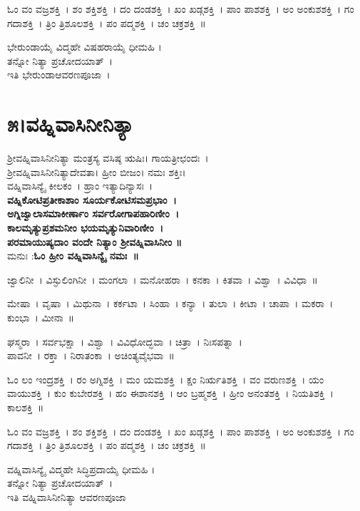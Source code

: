 ಓಂ ವಂ ವಜ್ರಶಕ್ತಿ~।  ಶಂ ಶಕ್ತಿಶಕ್ತಿ~।  ದಂ ದಂಡಶಕ್ತಿ~।  ಖಂ ಖಡ್ಗಶಕ್ತಿ~।  ಪಾಂ ಪಾಶಶಕ್ತಿ~।  ಅಂ ಅಂಕುಶಶಕ್ತಿ~।  ಗಂ ಗದಾಶಕ್ತಿ~।  ತ್ರಿಂ ತ್ರಿಶೂಲಶಕ್ತಿ~।  ಪಂ ಪದ್ಮಶಕ್ತಿ~।  ಚಂ ಚಕ್ರಶಕ್ತಿ~॥ 

ಭೇರುಂಡಾಯೈ ವಿದ್ಮಹೇ ವಿಷಹರಾಯೈ ಧೀಮಹಿ ।\\ತನ್ನೋ ನಿತ್ಯಾ ಪ್ರಚೋದಯಾತ್~।\\
ಇತಿ ಭೇರುಂಡಾಆವರಣಪೂಜಾ~।
\section{೫।ವಹ್ನಿವಾಸಿನೀನಿತ್ಯಾ}
ಶ್ರೀವಹ್ನಿವಾಸಿನೀನಿತ್ಯಾ ಮಂತ್ರಸ್ಯ ವಸಿಷ್ಠ ಋಷಿಃ। ಗಾಯತ್ರೀಛಂದಃ~।\\ ಶ್ರೀವಹ್ನಿವಾಸಿನೀನಿತ್ಯಾದೇವತಾ। ಹ್ರೀಂ ಬೀಜಂ। ನಮಃ ಶಕ್ತಿಃ।\\ ವಹ್ನಿವಾಸಿನ್ಯೈ ಕೀಲಕಂ~। ಹ್ರಾಂ ಇತ್ಯಾದಿನ್ಯಾಸಃ~।\\
{\bfseries ವಹ್ನಿಕೋಟಿಪ್ರತೀಕಾಶಾಂ ಸೂರ್ಯಕೋಟಿಸಮಪ್ರಭಾಂ~।\\
ಅಗ್ನಿಜ್ವಾಲಾಸಮಾಕೀರ್ಣಾಂ ಸರ್ವರೋಗಾಪಹಾರಿಣೀಂ~।\\
ಕಾಲಮೃತ್ಯುಪ್ರಶಮನೀಂ ಭಯಮೃತ್ಯುನಿವಾರಿಣೀಂ~।\\
ಪರಮಾಯುಷ್ಯದಾಂ ವಂದೇ ನಿತ್ಯಾಂ ಶ್ರೀವಹ್ನಿವಾಸಿನೀಂ ॥\\}
ಮನುಃ :{\bfseries ಓಂ ಹ್ರೀಂ ವಹ್ನಿವಾಸಿನ್ಯೈ ನಮಃ~॥}

ಜ್ವಾಲಿನೀ~। ವಿಸ್ಫುಲಿಂಗಿನೀ~। ಮಂಗಲಾ~। ಮನೋಹರಾ~। ಕನಕಾ~। ಕಿತವಾ~। ವಿಶ್ವಾ~। ವಿವಿಧಾ~॥

ಮೇಷಾ~। ವೃಷಾ~। ಮಿಥುನಾ~। ಕರ್ಕಟಾ~। ಸಿಂಹಾ~। ಕನ್ಯಾ~। ತುಲಾ~। ಕೀಟಾ~। ಚಾಪಾ~। ಮಕರಾ~। ಕುಂಭಾ~। ಮೀನಾ~॥ 

ಘಸ್ಮರಾ~। ಸರ್ವಭಕ್ಷಾ~। ವಿಶ್ವಾ~। ವಿವಿಧೋದ್ಭವಾ~। ಚಿತ್ರಾ~। ನಿಃಸಪತ್ನಾ~।\\ ಪಾವನೀ~। ರಕ್ತಾ~। ನಿರಾತಂಕಾ~। ಅಚಿಂತ್ಯವೈಭವಾ~॥

ಓಂ ಲಂ ಇಂದ್ರಶಕ್ತಿ~।  ರಂ ಅಗ್ನಿಶಕ್ತಿ~।  ಮಂ ಯಮಶಕ್ತಿ~।  ಕ್ಷಂ ನಿರ್ಋತಿಶಕ್ತಿ~।  ವಂ ವರುಣಶಕ್ತಿ~।  ಯಂ ವಾಯುಶಕ್ತಿ~।  ಕುಂ ಕುಬೇರಶಕ್ತಿ~।  ಹಂ ಈಶಾನಶಕ್ತಿ~।  ಆಂ ಬ್ರಹ್ಮಶಕ್ತಿ~।  ಹ್ರೀಂ ಅನಂತಶಕ್ತಿ~।  ನಿಯತಿಶಕ್ತಿ~।  ಕಾಲಶಕ್ತಿ~॥ 

ಓಂ ವಂ ವಜ್ರಶಕ್ತಿ~।  ಶಂ ಶಕ್ತಿಶಕ್ತಿ~।  ದಂ ದಂಡಶಕ್ತಿ~।  ಖಂ ಖಡ್ಗಶಕ್ತಿ~।  ಪಾಂ ಪಾಶಶಕ್ತಿ~।  ಅಂ ಅಂಕುಶಶಕ್ತಿ~।  ಗಂ ಗದಾಶಕ್ತಿ~।  ತ್ರಿಂ ತ್ರಿಶೂಲಶಕ್ತಿ~।  ಪಂ ಪದ್ಮಶಕ್ತಿ~।  ಚಂ ಚಕ್ರಶಕ್ತಿ~॥ 

ವಹ್ನಿವಾಸಿನ್ಯೈ ವಿದ್ಮಹೇ ಸಿದ್ಧಿಪ್ರದಾಯೈ ಧೀಮಹಿ ।\\ತನ್ನೋ ನಿತ್ಯಾ ಪ್ರಚೋದಯಾತ್~।\\
ಇತಿ ವಹ್ನಿವಾಸಿನೀನಿತ್ಯಾ ಆವರಣಪೂಜಾ
